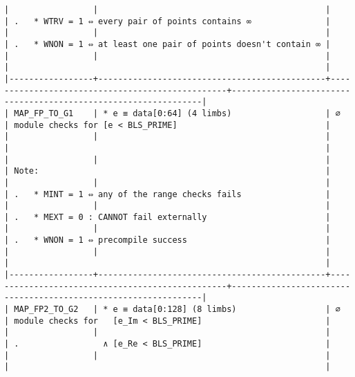 \documentclass[varwidth=\maxdimen,margin=0.5cm,multi={verbatim}]{standalone}
\begin{document}
\begin{verbatim}
|                 |                                              |                                                 | .   * WTRV = 1 ⇔ every pair of points contains ∞               |
|                 |                                              |                                                 | .   * WNON = 1 ⇔ at least one pair of points doesn't contain ∞ |
|                 |                                              |                                                 |                                                                |
|-----------------+----------------------------------------------+-------------------------------------------------+----------------------------------------------------------------|
| MAP_FP_TO_G1    | * e ≡ data[0:64] (4 limbs)                   | ∅                                               | module checks for [e < BLS_PRIME]                              |
|                 |                                              |                                                 |                                                                |
|                 |                                              |                                                 | Note:                                                          |
|                 |                                              |                                                 | .   * MINT = 1 ⇔ any of the range checks fails                 |
|                 |                                              |                                                 | .   * MEXT = 0 : CANNOT fail externally                        |
|                 |                                              |                                                 | .   * WNON = 1 ⇔ precompile success                            |
|                 |                                              |                                                 |                                                                |
|-----------------+----------------------------------------------+-------------------------------------------------+----------------------------------------------------------------|
| MAP_FP2_TO_G2   | * e ≡ data[0:128] (8 limbs)                  | ∅                                               | module checks for   [e_Im < BLS_PRIME]                         |
|                 |                                              |                                                 | .                 ∧ [e_Re < BLS_PRIME]                         |
|                 |                                              |                                                 |                                                                |

\end{verbatim}
\end{document}

